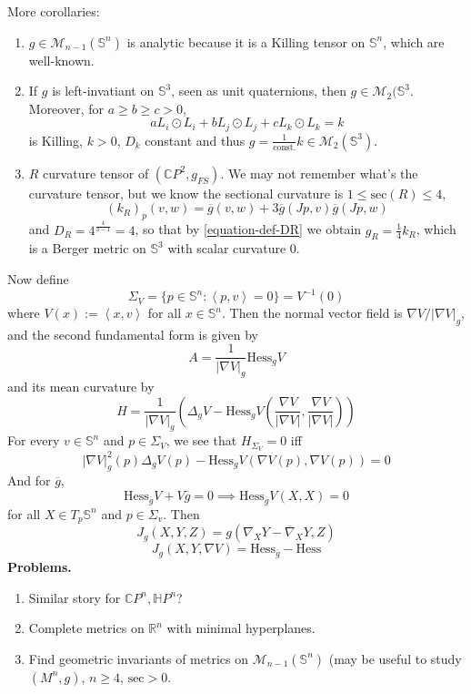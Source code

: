 More corollaries:
\begin{lemma}
\label{lemma-corollaries2}
\begin{enumerate}
\item $g\in\mathcal{M}_{n-1}(\mathbb{S}^n)$
is analytic because it is a Killing
tensor on $\mathbb{S}^n$, which are
well-known.
\item If $g$ is left-invatiant on
$\mathbb{S}^3$, seen as unit quaternions,
then
$g\in\mathcal{M}_2(\mathbb{S}^3$. Moreover,
for $a\geq b\geq c>0$,
$$
aL_i\odot L_i+bL_j\odot L_j+cL_k\odot L_k=k
$$
is Killing, $k>0$,  $D_k$ constant and thus
$g=\frac{1}{\text{const.}}k
\in\mathcal{M}_2(\mathbb{S}^3)$.
\item $R$ curvature tensor of
$(\mathbb{C}P^{2},g_{FS})$. We may not
remember
what's the curvature tensor, but we know the
sectional curvature is $1\leq
\text{sec}(R)\leq 4$,
$$
(k_R)_p(v,w)=\overline{g}(v,w)+3\overline{g}
(Jp,v)\overline{g}(Jp,w)
$$
and $D_R=4^{\frac{4}{3-1}}=4$, so that by
\ref{equation-def-DR} we obtain
$g_R=\frac{1}{4}k_R$, which is a Berger
metric on $\mathbb{S}^3$ with scalar
curvature 0.
\end{enumerate}
\end{lemma}

\bigskip
Now define
$$
\Sigma_V=\{p\in\mathbb{S}^n:\left\langle{}p,v\right\rangle{}=
0\}=V^{-1}(0)
$$
where $V(x):=\left\langle{}x,v\right\rangle{}$ for all
$x\in\mathbb{S}^n$. Then the normal
vector field is $\nabla V/|\nabla V|_g$, and
the second fundamental form is
given by
$$
A=\frac{1}{|\nabla V|_g}\text{Hess}_gV
$$
and its mean curvature by
\begin{equation}
\label{equation-mean-curva-level-sets-V}
H=\frac{1}{|\nabla
V|_g}\left(\Delta_gV-\text{Hess}
_gV\left(\frac{\nabla
V}{|\nabla V|},\frac{\nabla V}{|\nabla
V|}\right)\right)
\end{equation}
For every $v \in \mathbb{S}^n$ and
$p\in\Sigma_V$, we see that $H_{\Sigma_V}=0$
iff
$$
|\nabla
V|^2_g(p)\Delta_gV(p)-\text{Hess}_gV(\nabla
V(p),\nabla V(p))=0
$$
And for $\overline{g}$,
$$
\text{Hess}_{\overline{g}}V+V\overline{g}=
0\implies
\text{Hess}_{\overline{g}}V(X,X)=0
$$
for all $X\in T_p\mathbb{S}^n$ and
$p\in\Sigma_v$. Then
$$
J_g(X,Y,Z)=g(\nabla_XY-\overline{\nabla}_XY,
Z)
$$
$$
J_g(X,Y,\nabla
V)=\text{Hess}_{\overline{g}}-\text{Hess}
$$
{\bf Problems.}
\begin{enumerate}
\item Similar story for
$\mathbb{C}P^{n},\mathbb{H}P^n$?
\item Complete metrics on $\mathbb{R}^n$ with
minimal hyperplanes.
\item Find geometric invariants of metrics on
$\mathcal{M}_{n-1}(\mathbb{S}^n)$
(may be useful to study $(M^n,g)$, $n\geq 4$,
$\text{sec}>0$.
\end{enumerate}

